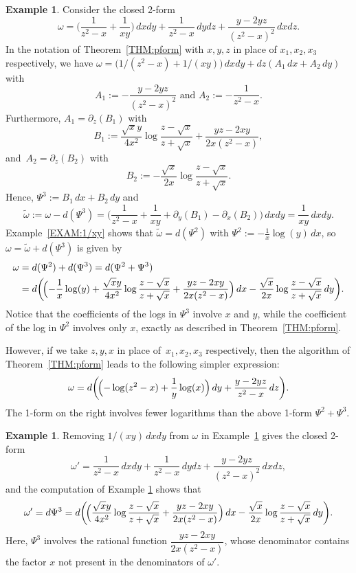 \documentclass{amsart}
\theoremstyle{definition}
\newtheorem{example}[thm]{Example}
\numberwithin{equation}{section}
\numberwithin{thm}{section}
\begin{document}
\begin{example}
\label{EXAM:2form}
Consider the closed 2-form
\[
\omega = \big( \frac{1}{z^2-x} + \frac{1}{x y}\big)\, dxdy + \frac{1}{z^2-x} \, dydz + \frac{y-2yz}{(z^2-x)^2}\, dxdz.
\]
In the notation of Theorem~\ref{THM:pform} with $x,y,z$ in place of $x_1,x_2,x_3$ respectively, we have
$\omega = \big( 1/(z^2-x) + 1/(xy) \big)\, dxdy + dz(A_1 \, dx + A_2 \, dy)$  with
\[
A_1 := -\frac{y-2yz}{(z^2-x)^2}  \text{ and } A_2 := -\frac{1}{z^2-x}.
\]
Furthermore, $A_1 = \partial_z(B_1)$ with
\[
B_1 := \frac{\sqrt{x}y}{4x^2} \log\frac{z-\sqrt{x}}{z+\sqrt{x}} + \frac{ yz - 2xy}{2x(z^2-x)},
\]
and~$A_2 = \partial_z(B_2)$ with
\[
B_2 := -\frac{\sqrt{x}}{2x} \log\frac{z-\sqrt{x}}{z+\sqrt{x}} .
\]
Hence, $\Psi^3 := B_1 \, dx + B_2 \, dy$ and
\[
\widetilde \omega := \omega - d(\Psi^3) = \bigg( \frac{1}{z^2-x} + \frac{1}{x y} + \partial_y(B_1)  - \partial_x(B_2) \bigg) \, dxdy = \frac{1}{xy}\, dxdy.
\]
Example~\ref{EXAM:1/xy} shows that $\widetilde{\omega} = d(\Psi^2)$ with $\Psi^2 := {-}\frac1x \log(y) \,dx$, so  $\omega =  \widetilde{\omega} + d(\Psi^3)$ is given by
\begin{align*}
\omega &= d(\Psi^2) + d(\Psi^3) =d(\Psi^2 +\Psi^3)\\
&= d\biggl(\! \Bigl({-} \frac{1}{x}\log(y) + \frac{\sqrt{x}y}{4x^2} \log\frac{z-\sqrt{x}}{z+\sqrt{x}} + \frac{ yz - 2xy}{2x(z^2-x)} \Bigr)\, dx -\frac{\sqrt{x}}{2x} \log\frac{z-\sqrt{x}}{z+\sqrt{x}} \, dy  \biggr).
\end{align*}
Notice that the coefficients of the logs in $\Psi^3$ involve $x$ and $y$, while the coefficient of the log in $\Psi^2$ involves only $x$, exactly as described in Theorem~\ref{THM:pform}.  

However, if we take $z,y,x$ in place of~$x_1,x_2,x_3$ respectively, then the algorithm of Theorem~\ref{THM:pform} leads to the following simpler expression:
\[
    \omega = d\biggl(\!\Bigl(-\log(z^2-x)+\frac{1}{y}\log(x)\Bigr)\, dy + \frac{y-2yz}{z^2-x} \, dz\biggr).
\]
The 1-form on the right involves fewer logarithms than the above 1-form $\Psi^2 + \Psi^3$.
\end{example}

\begin{example}
\label{EXAM:2form2}
Removing $1/(xy)\,dxdy$ from $\omega$ in Example~\ref{EXAM:2form} gives the closed 2-form
\[
\omega' =  \frac{1}{z^2-x}\, dxdy + \frac{1}{z^2-x} \, dydz + \frac{y-2yz}{(z^2-x)^2}\, dxdz,
\]
and the computation of Example \ref{EXAM:2form} shows that
\[
\omega' = d\Psi^3 = d\biggl(\! \Bigl(\frac{\sqrt{x}y}{4x^2} \log\frac{z-\sqrt{x}}{z+\sqrt{x}} + \frac{ yz - 2xy}{2x(z^2-x)} \Bigr)\, dx -\frac{\sqrt{x}}{2x} \log\frac{z-\sqrt{x}}{z+\sqrt{x}} \, dy  \biggr).
\]
Here, $\Psi^3$ involves the rational function $\dfrac{ yz - 2xy}{2x(z^2-x)}$, whose denominator contains the factor $x$ not present in the denominators of $\omega'$.  
\end{example}
\end{document}
